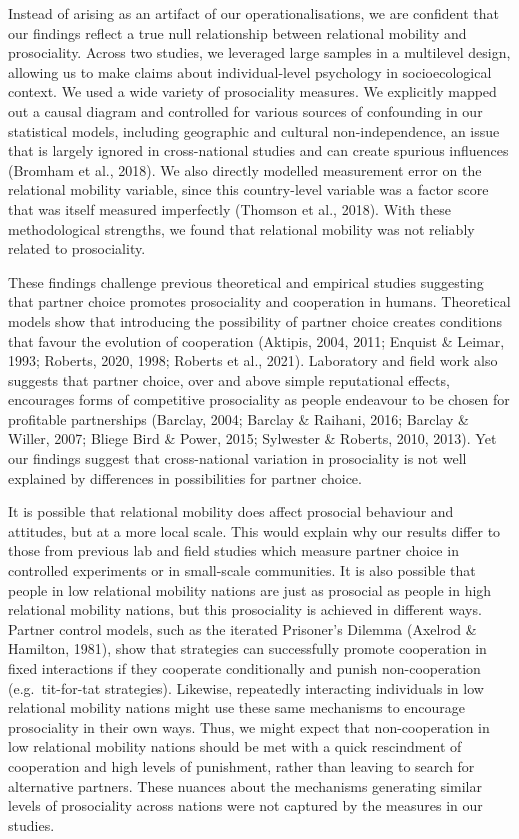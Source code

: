 \documentclass[
  man,floatsintext]{apa6}
\begin{document}
Instead of arising as an artifact of our operationalisations, we are confident that our findings reflect a true null relationship between relational mobility and prosociality. Across two studies, we leveraged large samples in a multilevel design, allowing us to make claims about individual-level psychology in socioecological context. We used a wide variety of prosociality measures. We explicitly mapped out a causal diagram and controlled for various sources of confounding in our statistical models, including geographic and cultural non-independence, an issue that is largely ignored in cross-national studies and can create spurious influences (Bromham et al., 2018). We also directly modelled measurement error on the relational mobility variable, since this country-level variable was a factor score that was itself measured imperfectly (Thomson et al., 2018). With these methodological strengths, we found that relational mobility was not reliably related to prosociality.

These findings challenge previous theoretical and empirical studies suggesting that partner choice promotes prosociality and cooperation in humans. Theoretical models show that introducing the possibility of partner choice creates conditions that favour the evolution of cooperation (Aktipis, 2004, 2011; Enquist \& Leimar, 1993; Roberts, 2020, 1998; Roberts et al., 2021). Laboratory and field work also suggests that partner choice, over and above simple reputational effects, encourages forms of competitive prosociality as people endeavour to be chosen for profitable partnerships (Barclay, 2004; Barclay \& Raihani, 2016; Barclay \& Willer, 2007; Bliege Bird \& Power, 2015; Sylwester \& Roberts, 2010, 2013). Yet our findings suggest that cross-national variation in prosociality is not well explained by differences in possibilities for partner choice.

It is possible that relational mobility does affect prosocial behaviour and attitudes, but at a more local scale. This would explain why our results differ to those from previous lab and field studies which measure partner choice in controlled experiments or in small-scale communities. It is also possible that people in low relational mobility nations are just as prosocial as people in high relational mobility nations, but this prosociality is achieved in different ways. Partner control models, such as the iterated Prisoner's Dilemma (Axelrod \& Hamilton, 1981), show that strategies can successfully promote cooperation in fixed interactions if they cooperate conditionally and punish non-cooperation (e.g.~tit-for-tat strategies). Likewise, repeatedly interacting individuals in low relational mobility nations might use these same mechanisms to encourage prosociality in their own ways. Thus, we might expect that non-cooperation in low relational mobility nations should be met with a quick rescindment of cooperation and high levels of punishment, rather than leaving to search for alternative partners. These nuances about the mechanisms generating similar levels of prosociality across nations were not captured by the measures in our studies.
\end{document}
